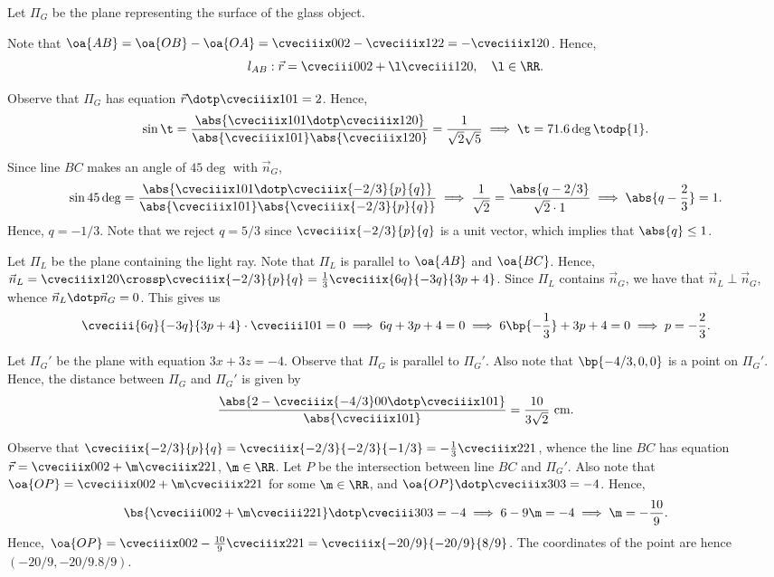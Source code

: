 \begin{solution}
    Let $\Pi_G$ be the plane representing the surface of the glass object.

    \begin{ppart}
        Note that $\oa{AB} = \oa{OB} - \oa{OA} = \cveciiix002 - \cveciiix122 = -\cveciiix120$. Hence, \[l_{AB} : \vec r = \cveciii002 + \l \cveciii120, \quad \l \in \RR.\]
    \end{ppart}
    \begin{ppart}
        Observe that $\Pi_G$ has equation $\vec r \dotp \cveciiix101 = 2$. Hence, \[\sin \t = \frac{\abs{\cveciiix101 \dotp \cveciiix120}}{\abs{\cveciiix101} \abs{\cveciiix120}} = \frac1{\sqrt2 \sqrt5} \implies \t = 71.6 \deg \todp{1}.\]
    \end{ppart}
    \begin{ppart}
        Since line $BC$ makes an angle of $45 \deg$ with $\vec n_G$, \[\sin 45\deg = \frac{\abs{\cveciiix101 \dotp \cveciiix{-2/3}{p}{q}}}{\abs{\cveciiix101} \abs{\cveciiix{-2/3}{p}{q}}} \implies \frac1{\sqrt2} = \frac{\abs{q - 2/3}}{\sqrt2 \cdot 1} \implies \abs{q - \frac23} = 1.\] Hence, $q = -1/3$. Note that we reject $q = 5/3$ since $\cveciiix{-2/3}{p}{q}$ is a unit vector, which implies that $\abs{q} \leq 1$.

        Let $\Pi_L$ be the plane containing the light ray. Note that $\Pi_L$ is parallel to $\oa{AB}$ and $\oa{BC}$. Hence, $\vec n_L = \cveciiix120 \crossp \cveciiix{-2/3}{p}{q} = \frac13 \cveciiix{6q}{-3q}{3p + 4}$. Since $\Pi_L$ contains $\vec n_G$, we have that $\vec n_L \perp \vec n_G$, whence $\vec n_L \dotp \vec n_G = 0$. This gives us \[\cveciii{6q}{-3q}{3p + 4} \cdot \cveciii101 = 0 \implies 6q + 3p + 4 = 0 \implies 6 \bp{-\frac13} + 3p + 4 = 0 \implies p = -\frac23.\]
    \end{ppart}
    \begin{ppart}
        Let $\Pi_G'$ be the plane with equation $3x + 3z = -4$. Observe that $\Pi_G$ is parallel to $\Pi_G'$. Also note that $\bp{-4/3, 0, 0}$ is a point on $\Pi_G'$. Hence, the distance between $\Pi_G$ and $\Pi_G'$ is given by \[\frac{\abs{2 - \cveciiix{-4/3}00 \dotp \cveciiix101}}{\abs{\cveciiix101}} = \frac{10}{3\sqrt2} \text{ cm}.\]
    \end{ppart}
    \begin{ppart}
        Observe that $\cveciiix{-2/3}{p}{q} = \cveciiix{-2/3}{-2/3}{-1/3} = -\frac13 \cveciiix221$, whence the line $BC$ has equation $\vec r  = \cveciiix002 + \m \cveciiix221$, $\m \in \RR$. Let $P$ be the intersection between line $BC$ and $\Pi_G'$. Also note that $\oa{OP} = \cveciiix002 + \m \cveciiix221$ for some $\m \in \RR$, and $\oa{OP} \dotp \cveciiix303 = -4$. Hence, \[\bs{\cveciii002 + \m \cveciii221} \dotp \cveciii303 = -4 \implies 6 - 9\m = -4 \implies \m = -\frac{10}9.\] Hence, $\oa{OP} = \cveciiix002 - \frac{10}9 \cveciiix221 = \cveciiix{-20/9}{-20/9}{8/9}$. The coordinates of the point are hence $(-20/9, -20/9. 8/9)$.
    \end{ppart}
\end{solution}